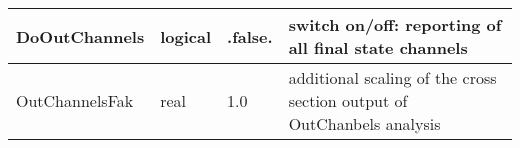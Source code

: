 \documentclass{article}
\begin{document}
\begin{longtable}{llll}
\midrule
DoOutChannels & \begin{minipage}[t]{2cm}logical\end{minipage} & \begin{minipage}[t]{2cm}.false.\end{minipage} & \begin{minipage}[t]{12cm}switch on/off: reporting of all final state channels\end{minipage}\\*
\midrule
OutChannelsFak & \begin{minipage}[t]{2cm}real\end{minipage} & \begin{minipage}[t]{2cm}1.0\end{minipage} & \begin{minipage}[t]{12cm}additional scaling of the cross section output of OutChanbels analysis\end{minipage}\\*
\bottomrule
\end{longtable}
{ }



\end{document}
